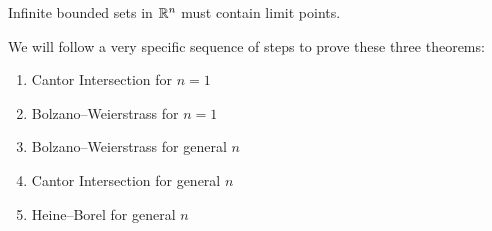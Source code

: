 \begin{theorem}
Infinite bounded sets in $\mathbb R^n$ must contain limit points.
\end{theorem}

We will follow a very specific sequence of steps to prove these three theorems:
\begin{enumerate}[label=(\alph*)]
\item Cantor Intersection for $n=1$
\item Bolzano--Weierstrass for $n=1$
\item Bolzano--Weierstrass for general $n$
\item Cantor Intersection for general $n$
\item Heine--Borel for general $n$
\end{enumerate}

